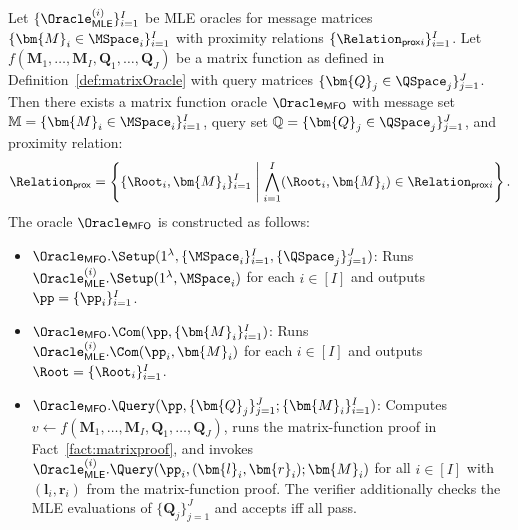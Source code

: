 \begin{lemma}
\label{lemma:matrix_function_queries}
Let $\{\Oracle_{\mathsf{MLE}}^{(i)}\}_{i=1}^I$ be MLE oracles for message matrices
$\{\bm{M}_i \in \MSpace_i\}_{i=1}^I$ with proximity relations $\{\Relation_{\mathsf{prox}i}\}_{i=1}^I$.
Let
$f(\bm{M}_1,\dots,\bm{M}_I,\bm{Q}_1,\dots,\bm{Q}_J)$
be a matrix function as defined in Definition~\ref{def:matrixOracle} with query matrices
$\{\bm{Q}_j \in \QSpace_j\}_{j=1}^J$.
Then there exists a matrix function oracle $\Oracle_{\mathsf{MFO}}$ with message set $\mathbb{M} = \{\bm{M}_i \in \MSpace_i\}_{i=1}^I$, query set $\mathbb{Q} = \{\bm{Q}_j \in \QSpace_j\}_{j=1}^J$,
and proximity relation:
\[
\Relation_{\mathsf{prox}}
=
\left\{
\{\Root_i,\bm{M}_i\}_{i=1}^I \;\middle|\;
\bigwedge_{i=1}^I (\Root_i,\bm{M}_i)\in\Relation_{\mathsf{prox}i}
\right\}.
\]
The oracle $\Oracle_{\mathsf{MFO}}$ is constructed as follows:
\begin{itemize}
    \item
    $\Oracle_{\mathsf{MFO}}.\Setup(1^\lambda,\{\MSpace_i\}_{i=1}^I,\{\QSpace_j\}_{j=1}^J)$:
    Runs $\Oracle_{\mathsf{MLE}}^{(i)}.\Setup(1^\lambda,\MSpace_i)$ for each $i\in[I]$
    and outputs $\pp=\{\pp_i\}_{i=1}^I$.
    \item
    $\Oracle_{\mathsf{MFO}}.\Com(\pp,\{\bm{M}_i\}_{i=1}^I)$: Runs
    $\Oracle_{\mathsf{MLE}}^{(i)}.\Com(\pp_i,\bm{M}_i)$ for each $i\in[I]$
    and outputs $\Root=\{\Root_i\}_{i=1}^I$.
    \item
    $\Oracle_{\mathsf{MFO}}.\Query(\pp,\{\bm{Q}_j\}_{j=1}^J; \{\bm{M}_i\}_{i=1}^I)$: Computes
    $v \leftarrow f(\bm{M}_1,\dots,\bm{M}_I,\bm{Q}_1,\dots,\bm{Q}_J)$,
    runs the matrix-function proof in Fact~\ref{fact:matrixproof},
    and invokes $\Oracle_{\mathsf{MLE}}^{(i)}.\Query(\pp_i, (\bm{l}_i, \bm{r}_i); \bm{M}_i)$ for all $i\in[I]$ with $(\bm{l}_i,\bm{r}_i)$ from the matrix-function proof.
    The verifier additionally checks the MLE evaluations of
    $\{\bm{Q}_j\}_{j=1}^J$ and accepts iff all pass.
\end{itemize}

\end{lemma}

